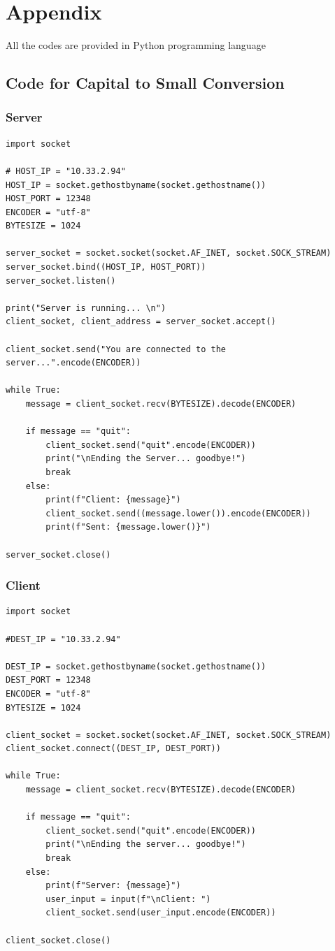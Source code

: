 \documentclass[11pt]{article}
\begin{document}
\section*{Appendix}

All the codes are provided in Python programming language

\subsection*{Code for Capital to Small Conversion}
\subsubsection*{Server}
\begin{verbatim}
import socket

# HOST_IP = "10.33.2.94"
HOST_IP = socket.gethostbyname(socket.gethostname())
HOST_PORT = 12348
ENCODER = "utf-8"
BYTESIZE = 1024

server_socket = socket.socket(socket.AF_INET, socket.SOCK_STREAM)
server_socket.bind((HOST_IP, HOST_PORT))
server_socket.listen()

print("Server is running... \n")
client_socket, client_address = server_socket.accept()

client_socket.send("You are connected to the server...".encode(ENCODER))

while True:
    message = client_socket.recv(BYTESIZE).decode(ENCODER)

    if message == "quit":
        client_socket.send("quit".encode(ENCODER))
        print("\nEnding the Server... goodbye!")
        break
    else:
        print(f"Client: {message}")
        client_socket.send((message.lower()).encode(ENCODER))
        print(f"Sent: {message.lower()}")

server_socket.close()
\end{verbatim}
\subsubsection*{Client}
\begin{verbatim}
import socket

#DEST_IP = "10.33.2.94"

DEST_IP = socket.gethostbyname(socket.gethostname())
DEST_PORT = 12348
ENCODER = "utf-8"
BYTESIZE = 1024

client_socket = socket.socket(socket.AF_INET, socket.SOCK_STREAM)
client_socket.connect((DEST_IP, DEST_PORT))

while True:
    message = client_socket.recv(BYTESIZE).decode(ENCODER)

    if message == "quit":
        client_socket.send("quit".encode(ENCODER))
        print("\nEnding the server... goodbye!")
        break
    else:
        print(f"Server: {message}")
        user_input = input(f"\nClient: ")
        client_socket.send(user_input.encode(ENCODER))

client_socket.close()
\end{verbatim}
\end{document}
